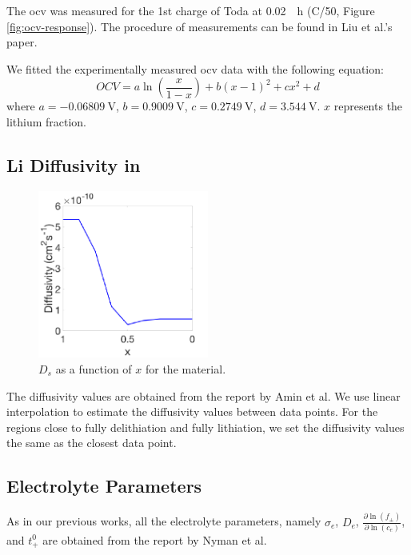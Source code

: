 \documentclass{article}
\begin{document}
The \gls{ocv} was measured for the 1st charge of Toda \nca{} at
\SI{0.02}{\per\hour} (C/50, Figure \ref{fig:ocv-response}). The
procedure of measurements can be found in Liu et al.'s
paper\cite{liu2017}.

We fitted the experimentally measured \gls{ocv} data with the
following equation:
\begin{equation}
  \mathit{OCV}=a\ln \left(\frac x{1-x}\right)+b\left(x-1\right)^2+cx^2+d
  \label{eq:12}
\end{equation}
where $a=\SI{-0.06809}{\volt}$, $b=\SI{0.9009}{\volt}$,
$c=\SI{0.2749}{\volt}$, $d=\SI{3.544}{\volt}$. $x$ represents the
lithium fraction.

\subsection{Li Diffusivity in \nca{}}

\begin{figure}
  \begin{center}
    \includegraphics[width=0.5\textwidth]{diffusivity.pdf}
  \end{center}
  \caption{$D_s$ as a function of $x$ for the \nca{} material\cite{amin2015}.}
  \label{fig:diffusivity}
\end{figure}

The diffusivity values are obtained from the report by Amin et
al\cite{amin2015}. We use linear interpolation to estimate the
diffusivity values between data points. For the regions close to
fully delithiation and fully lithiation, we set the diffusivity values
the same as the closest data point.

\subsection{Electrolyte Parameters}

As in our previous works\cite{dasgupta2020,dasgupta2020-2}, all the electrolyte parameters,
namely $\sigma_e$, $D_e$, $\frac{\partial \ln
  \left(f_\pm\right)}{\partial \ln \left(c_e\right)}$, and $t_+^0$ are
obtained from the report by Nyman et al\cite{lindbergh2008}.
\end{document}
